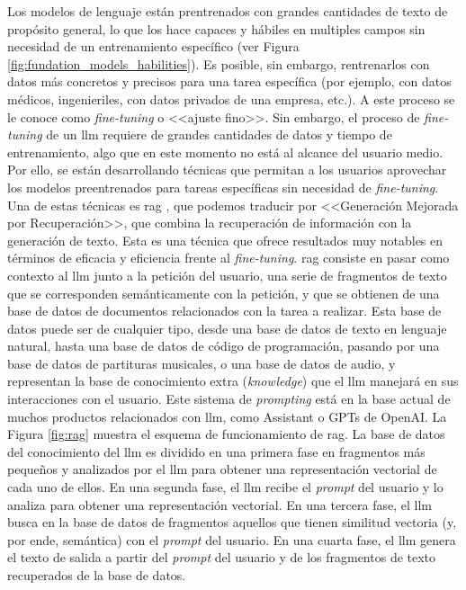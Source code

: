 Los modelos de lenguaje están prentrenados con grandes cantidades de texto de propósito general, lo que los hace capaces y hábiles en multiples campos sin necesidad de un entrenamiento específico (ver Figura \ref{fig:fundation_models_habilities}). Es posible, sin embargo, rentrenarlos con datos más concretos y precisos para una tarea específica (por ejemplo, con datos médicos, ingenieriles, con datos privados de una empresa, etc.). A este proceso se le conoce como \textit{fine-tuning} o <<ajuste fino>>. Sin embargo, el proceso de \textit{fine-tuning} de un \gls{llm} requiere de grandes cantidades de datos y tiempo de entrenamiento, algo que en este momento no está al alcance del usuario medio. Por ello, se están desarrollando técnicas que permitan a los usuarios aprovechar los modelos preentrenados para tareas específicas sin necesidad de \textit{fine-tuning}. Una de estas técnicas es \gls{rag} \citep{WhatRetrievalaugmentedGeneration2021}, que podemos traducir por <<Generación Mejorada por Recuperación>>, que combina la recuperación de información con la generación de texto. Esta es una técnica que ofrece resultados muy notables en términos de eficacia y eficiencia frente al \textit{fine-tuning}. \gls{rag} consiste en pasar como contexto al \gls{llm} junto a la petición del usuario, una serie de fragmentos de texto que se corresponden semánticamente con la petición, y que se obtienen de una base de datos de documentos relacionados con la tarea a realizar. Esta base de datos puede ser de cualquier tipo, desde una base de datos de texto en lenguaje natural, hasta una base de datos de código de programación, pasando por una base de datos de partituras musicales, o una base de datos de audio, y representan la base de conocimiento extra (\textit{knowledge}) que el \gls{llm} manejará en sus interacciones con el usuario. Este sistema de \textit{prompting} está en la base actual de muchos productos relacionados con \gls{llm}, como Assistant o GPTs de OpenAI. La Figura \ref{fig:rag} muestra el esquema de funcionamiento de \gls{rag}. La base de datos del conocimiento del \gls{llm} es dividido en una primera fase en fragmentos más pequeños y analizados por el \gls{llm} para obtener una representación vectorial de cada uno de ellos. En una segunda fase, el \gls{llm} recibe el \textit{prompt} del usuario y lo analiza para obtener una representación vectorial. En una tercera fase, el \gls{llm} busca en la base de datos de fragmentos aquellos que tienen similitud vectoria (y, por ende, semántica) con el \textit{prompt} del usuario. En una cuarta fase, el \gls{llm} genera el texto de salida a partir del \textit{prompt} del usuario y de los fragmentos de texto recuperados de la base de datos. 


